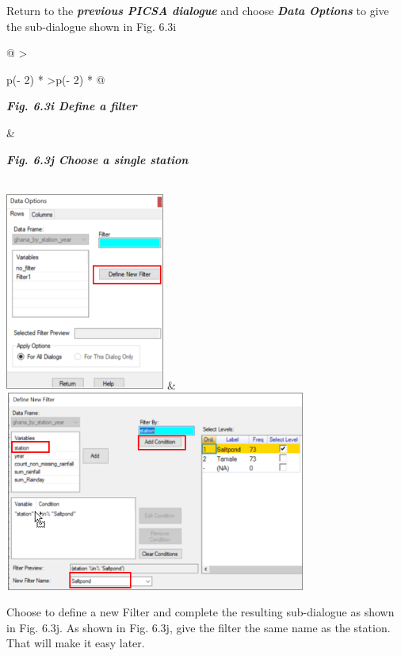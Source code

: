 \documentclass[
  letterpaper,
  DIV=11,
  numbers=noendperiod]{scrreprt}
\begin{document}
Return to the \textbf{\emph{previous PICSA dialogue}} and choose
\textbf{\emph{Data Options}} to give the sub-dialogue shown in Fig. 6.3i

\begin{longtable}[]{@{}
  >{\raggedright\arraybackslash}p{(\columnwidth - 2\tabcolsep) * }
  >{\raggedleft\arraybackslash}p{(\columnwidth - 2\tabcolsep) * }@{}}
\toprule\noalign{}
\begin{minipage}[b]{\linewidth}\raggedright
\textbf{\emph{Fig. 6.3i Define a filter}}
\end{minipage} & \begin{minipage}[b]{\linewidth}\raggedleft
\textbf{\emph{Fig. 6.3j Choose a single station}}
\end{minipage} \\
\midrule\noalign{}
\endhead
\bottomrule\noalign{}
\endlastfoot
\includegraphics[width=2.06576in,height=2.56044in]{figures/Fig6.3i.png}
&
\includegraphics[width=3.91022in,height=2.58761in]{figures/Fig6.3j.png} \\
\end{longtable}

Choose to define a new Filter and complete the resulting sub-dialogue as
shown in Fig. 6.3j. As shown in Fig. 6.3j, give the filter the same name
as the station. That will make it easy later.
\end{document}
